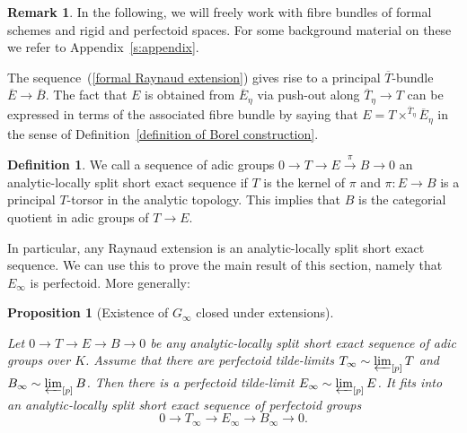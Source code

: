\documentclass[10pt,oneside]{amsart}
\newtheorem{proposition}[theorem]{Proposition}
\theoremstyle{definition}
\newtheorem{definition}[theorem]{Definition}
\newtheorem{remark}[theorem]{Remark}
\begin{document}
	
	\begin{remark}
	In the following, we will freely work with fibre bundles of formal schemes and rigid and perfectoid spaces. For some background material on these we refer to Appendix~\ref{s:appendix}.
	\end{remark}
	
	The sequence~(\ref{formal Raynaud extension}) gives rise to a principal $\overline{T}$-bundle
	$\overline{E}\rightarrow \overline{B}$. The fact that $E$ is obtained from $\overline{E}_\eta$ via push-out along $\overline{T}_\eta\rightarrow T$ can be expressed in terms of the associated fibre bundle by saying that $E = T\times^{\overline{T}_\eta}\overline{E}_\eta$ in the sense of Definition~\ref{definition of Borel construction}.
	\begin{definition}
		We call a sequence of adic groups $0\to T\to E\xrightarrow{\pi} B\to 0$ an analytic-locally split short exact sequence if $T$ is the kernel of $\pi$ and $\pi:E\to B$ is a principal $T$-torsor in the analytic topology. This implies that $B$ is the categorial quotient in adic groups of $T\to E$.
	\end{definition}
	In particular, any Raynaud extension is an analytic-locally split short exact sequence. We can use this to prove the main result of this section, namely that $E_\infty$ is perfectoid. More generally:
	\begin{proposition}[Existence of $G_\infty$ closed under extensions]\label{p-F-formal tower exists for E}
		
		Let $0\to T\to E\to B\to 0$ be any analytic-locally split short exact sequence of adic groups over $K$. Assume that there are perfectoid tilde-limits $T_\infty \sim \varprojlim_{[p]} T$ and $B_\infty\sim \varprojlim_{[p]}B$. Then
		there is a perfectoid tilde-limit $E_\infty\sim \varprojlim_{[p]}E$. It fits into an analytic-locally split short exact sequence of perfectoid groups 
		\[0\to T_\infty\to E_\infty\to B_\infty\to 0.\]
	\end{proposition}
\end{document}
